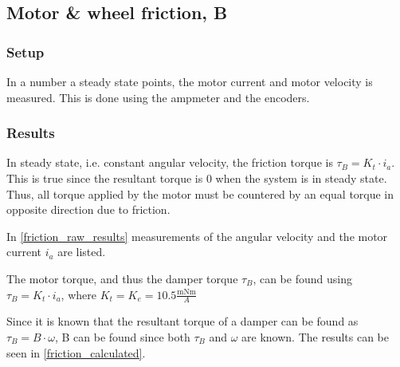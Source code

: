 \subsection{Motor \& wheel friction, B}
\subsubsection{Setup}
In a number a steady state points, the motor current and motor velocity is measured. This is done using the ampmeter and the encoders.

\subsubsection{Results}
In steady state, i.e. constant angular velocity, the friction torque is $\tau_B = K_t \cdot i_a$.
This is true since the resultant torque is 0 when the system is in steady state. Thus, all torque applied by the motor must be countered by an equal torque in opposite direction due to friction.

In \autoref{friction_raw_results} measurements of the angular velocity and the motor current $i_a$ are listed.
\begin{table}[H]
\centering
{}
\caption{The measurements of the angular velocity and $I_a$ for determining the damper coefficient B.}
\label{friction_raw_results}
\end{table}

The motor torque, and thus the damper torque $\tau_B$, can be found using $\tau_B = K_t \cdot i_a$, where $K_t = K_e =  10.5 \frac{ \text{mNm}}{A}$ 

Since it is known that the resultant torque of a damper can be found as $\tau_B = B\cdot \omega$, B can be found since both $\tau_B$ and $\omega$ are known. The results can be seen in \autoref{friction_calculated}.

